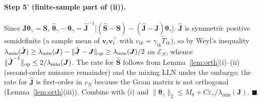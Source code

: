 \paragraph{Step 5$'$ (finite-sample part of (ii)).}
Since $\boldsymbol J\boldsymbol\theta_\gamma=\boldsymbol S$,
$\hat{\boldsymbol\theta}_\gamma-\boldsymbol\theta_\gamma=\hat{\boldsymbol J}^{-1}\big[(\hat{\boldsymbol S}-\boldsymbol S)-(\hat{\boldsymbol J}-\boldsymbol J)\boldsymbol\theta_\gamma\big]$.
$\hat{\boldsymbol J}$ is symmetric positive semidefinite (a sample mean of $\boldsymbol v_t\boldsymbol v_t^\top$ with $v_{tk}=\gamma_{tk}\tilde T_{tk}$),
so by Weyl's inequality $\lambda_{\min}(\hat{\boldsymbol J})\ge\lambda_{\min}(\boldsymbol J)-\|\hat{\boldsymbol J}-\boldsymbol J\|_{\rm op}\ge\lambda_{\min}(\boldsymbol J)/2$ on $\mathcal E_N$,
whence $\|\hat{\boldsymbol J}^{-1}\|_{\rm op}\le 2/\lambda_{\min}(\boldsymbol J)$. The rate for $\hat{\boldsymbol S}$ follows from Lemma~\ref{lem:orth}(i)--(ii)
(second-order nuisance remainder) and the mixing LLN under the embargo; the rate for $\hat{\boldsymbol J}$ is first-order in $r_N$ because the
Gram matrix is not orthogonal (Lemma~\ref{lem:orth}(iii)). Combine with (i) and $\|\boldsymbol\theta_\gamma\|_2\le M_\theta+C\varepsilon_\gamma/\lambda_{\min}(\boldsymbol J)$. $\blacksquare$

